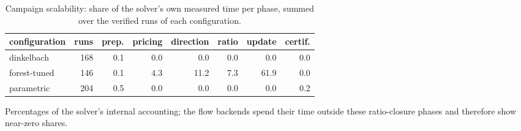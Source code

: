 \begin{table}[tbp]
\centering
\caption{Campaign scalability: share of the solver's own measured time per phase, summed over the verified runs of each configuration.}
\label{tab:scalability-breakdown}
\small
\begin{adjustbox}{max width=\textwidth}
\begin{tabular}{lrrrrrrr}
\toprule
configuration & runs & prep. & pricing & direction & ratio & update & certif. \\
\midrule
dinkelbach & 168 & 0.1 & 0.0 & 0.0 & 0.0 & 0.0 & 0.0 \\
forest-tuned & 146 & 0.1 & 4.3 & 11.2 & 7.3 & 61.9 & 0.0 \\
parametric & 204 & 0.5 & 0.0 & 0.0 & 0.0 & 0.0 & 0.2 \\
\bottomrule
\end{tabular}
\end{adjustbox}
\par\vspace{2pt}\footnotesize Percentages of the solver's internal accounting; the flow backends spend their time outside these ratio-closure phases and therefore show near-zero shares.
\end{table}
